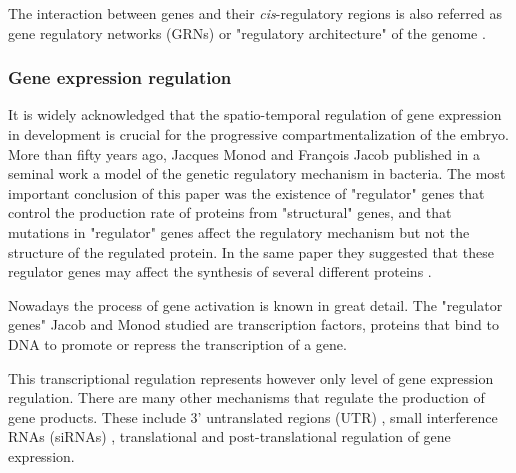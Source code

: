 %
The interaction between genes and their \textit{cis}-regulatory regions is also referred as gene regulatory networks (GRNs) or "regulatory architecture" of the genome \citep{Davidson2001}.




\subsubsection{Gene expression regulation}

It is widely acknowledged that the spatio-temporal regulation of gene expression in development is crucial for the progressive compartmentalization of the embryo. 
More than fifty years ago, Jacques Monod and Fran\c cois Jacob \citep{Jacob1961} published in a seminal work a model of the genetic regulatory mechanism in bacteria.
The most important conclusion of this paper was the existence of "regulator" genes that control the production rate of proteins from "structural" genes, and that mutations in "regulator" genes affect the regulatory mechanism but not the structure of the regulated protein. In the same paper they suggested that these regulator genes may affect the synthesis of several different proteins \citep{Jacob1961}.

Nowadays the process of gene activation is known in great detail. The  "regulator genes" Jacob and Monod studied are transcription factors, proteins that bind to DNA to promote or repress the transcription of a gene.

This transcriptional regulation represents however only level of gene expression regulation. There are many other mechanisms that regulate the production of gene products. These include 3' untranslated regions (UTR) \citep{Grzybowska2001}, small interference RNAs (siRNAs) \citep{Filipowicz2005}, translational \citep{Kozak1992,Kapp2004} and post-translational \citep{Mann2003} regulation of gene expression.

